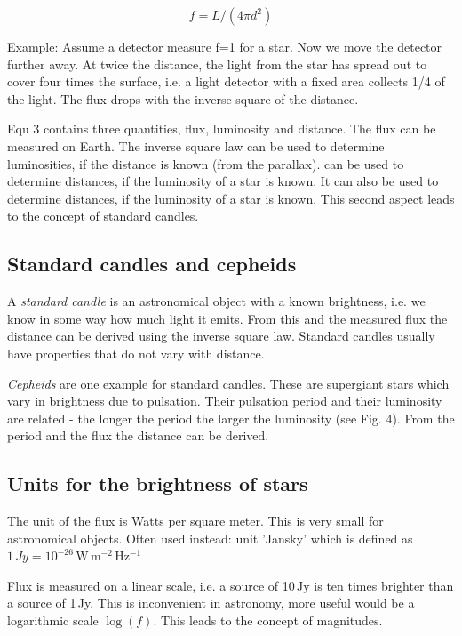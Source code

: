 \begin{equation}
f = L / (4 \pi d^2)
\end{equation}

Example: Assume a detector measure f=1 for a star. Now we move the detector further away. At twice the distance, the light from the star has spread out to cover four times the surface, i.e. a light detector with a fixed area collects 1/4 of the light. The flux drops with the inverse square of the distance.

Equ 3 contains three quantities, flux, luminosity and distance. The flux can be measured on Earth. The inverse square law can be used to determine luminosities, if the distance is known (from the parallax). can be used to determine distances, if the luminosity of a star is known. It can also be used to determine distances, if the luminosity of a star is known. This second aspect leads to the concept of standard candles.

\subsection{Standard candles and cepheids}

A \textit{standard candle} is an astronomical object with a known brightness, i.e. we know in some way how much light it emits. From this and the measured flux the distance can be derived using the inverse square law. Standard candles usually have properties that do not vary with distance.

\textit{Cepheids} are one example for standard candles. These are supergiant stars which vary in brightness due to pulsation. Their pulsation period and their luminosity are related - the longer the period the larger the luminosity (see Fig. 4). From the period and the flux the distance can be derived.

\subsection{Units for the brightness of stars}

The unit of the flux is Watts per square meter. This is very small for astronomical objects. Often used instead: unit 'Jansky' which is defined as $1\,Jy = 10^{-26}$\,W\,m$^{-2}$\,Hz$^{-1}$

Flux is measured on a linear scale, i.e. a source of 10\,Jy is ten times brighter than a source of 1\,Jy. This is inconvenient in astronomy, more useful would be a logarithmic scale $\log{(f)}$. This leads to the concept of magnitudes.

